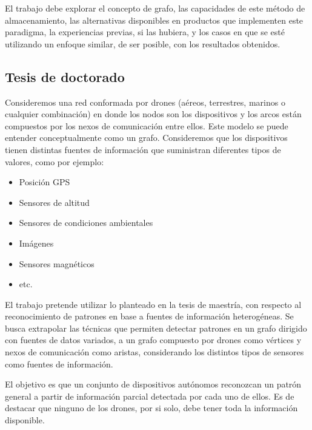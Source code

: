 \documentclass[
	11pt,oneside,a4paper,
	headsepline,footsepline,plainfootsepline,plainheadsepline,
	fleqn,
	flushbottom,
	raggedbottom
]{memoir}
\begin{document}
	El trabajo debe explorar el concepto de grafo, las capacidades de este método de almacenamiento, las alternativas disponibles en productos que implementen este paradigma, la experiencias previas, si las hubiera, y los casos en que se esté utilizando un enfoque similar, de ser posible, con los resultados obtenidos.
	
	\subsection*{Tesis de doctorado}
	Consideremos una red conformada por drones (aéreos, terrestres, marinos o cualquier combinación) en donde los nodos son los dispositivos y los arcos están compuestos por los nexos de comunicación entre ellos. Este modelo se puede entender conceptualmente como un grafo.
	Consideremos que los dispositivos tienen distintas fuentes de información que suministran diferentes tipos de valores, como por ejemplo:
	
	\begin{itemize}
		\item Posición GPS
		\item Sensores de altitud
		\item Sensores de condiciones ambientales
		\item Imágenes
		\item Sensores magnéticos
		\item etc.
	\end{itemize}
	
	El trabajo pretende utilizar lo planteado en la tesis de maestría, con respecto al reconocimiento de patrones en base a fuentes de información heterogéneas. Se busca extrapolar las técnicas que permiten detectar patrones en un grafo dirigido con fuentes de datos variados, a un grafo compuesto por drones como vértices y nexos de comunicación como aristas, considerando los distintos tipos de sensores como fuentes de información.
	
	El objetivo es que un conjunto de dispositivos autónomos reconozcan un patrón general a partir de información parcial detectada por cada uno de ellos. Es de destacar que ninguno de los drones, por si solo, debe tener toda la información disponible.
	
\end{document}
